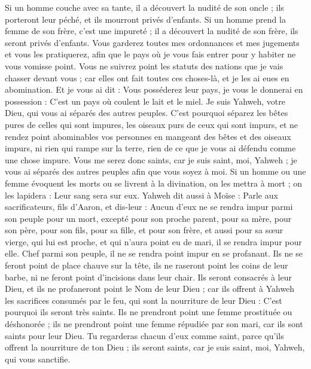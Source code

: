 \begin{multicols}{2}
Si un homme couche avec sa tante, il a découvert la nudité de son oncle ; ils porteront leur péché, et ils mourront privés d'enfants.
Si un homme prend la femme de son frère, c'est une impureté ; il a découvert la nudité de son frère, ils seront privés d'enfants.
Vous garderez toutes mes ordonnances et mes jugements et vous les pratiquerez, afin que le pays où je vous fais entrer pour y habiter ne vous vomisse point.
Vous ne suivrez point les statuts des nations que je vais chasser devant vous ; car elles ont fait toutes ces choses-là, et je les ai eues en abomination.
Et je vous ai dit : Vous posséderez leur pays, je vous le donnerai en possession : C'est un pays où coulent le lait et le miel. Je suis Yahweh, votre Dieu, qui vous ai séparés des autres peuples.
C'est pourquoi séparez les bêtes pures de celles qui sont impures, les oiseaux purs de ceux qui sont impurs, et ne rendez point abominables vos personnes en mangeant des bêtes et des oiseaux impurs, ni rien qui rampe sur la terre, rien de ce que je vous ai défendu comme une chose impure.
Vous me serez donc saints, car je suis saint, moi, Yahweh ; je vous ai séparés des autres peuples afin que vous soyez à moi.
Si un homme ou une femme évoquent les morts ou se livrent à la divination, on les mettra à mort ; on les lapidera : Leur sang sera sur eux.
\VerseOne{}Yahweh dit aussi à Moïse : Parle aux sacrificateurs, fils d'Aaron, et dis-leur : Aucun d'eux ne se rendra impur parmi son peuple pour un mort,
excepté pour son proche parent, pour sa mère, pour son père, pour son fils, pour sa fille, et pour son frère,
et aussi pour sa sœur vierge, qui lui est proche, et qui n'aura point eu de mari, il se rendra impur pour elle.
Chef parmi son peuple, il ne se rendra point impur en se profanant.
Ils ne se feront point de place chauve sur la tête, ils ne raseront point les coins de leur barbe, ni ne feront point d'incisions dans leur chair.
Ils seront consacrés à leur Dieu, et ils ne profaneront point le Nom de leur Dieu ; car ils offrent à Yahweh les sacrifices consumés par le feu, qui sont la nourriture de leur Dieu : C'est pourquoi ils seront très saints.
Ils ne prendront point une femme prostituée ou déshonorée ; ils ne prendront point une femme répudiée par son mari, car ils sont saints pour leur Dieu.
Tu regarderas chacun d'eux comme saint, parce qu'ils offrent la nourriture de ton Dieu ; ils seront saints, car je suis saint, moi, Yahweh, qui vous sanctifie.

\end{multicols}
